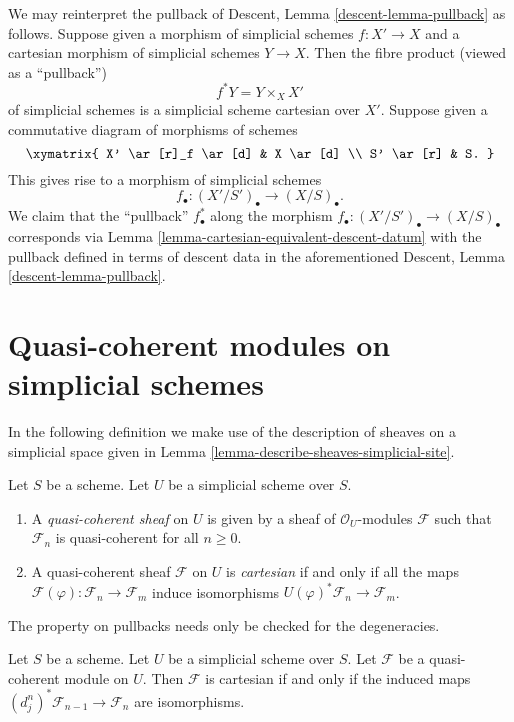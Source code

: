 \noindent
We may reinterpret the pullback of
Descent, Lemma \ref{descent-lemma-pullback} as follows.
Suppose given a morphism of simplicial schemes $f : X' \to X$ and a
cartesian morphism of simplicial schemes $Y \to X$. Then
the fibre product (viewed as a ``pullback'')
$$
f^*Y = Y \times_X X'
$$
of simplicial schemes is a simplicial scheme cartesian over $X'$.
Suppose given a commutative diagram of morphisms of schemes
$$
\xymatrix{
X' \ar[r]_f \ar[d] & X \ar[d] \\
S' \ar[r] & S.
}
$$
This gives rise to a morphism of simplicial schemes
$$
f_\bullet : (X'/S')_\bullet \longrightarrow (X/S)_\bullet.
$$
We claim that the ``pullback'' $f_\bullet^*$ along the morphism
$f_\bullet : (X'/S')_\bullet \to (X/S)_\bullet$ corresponds via
Lemma \ref{lemma-cartesian-equivalent-descent-datum}
with the pullback defined in terms of descent data in
the aforementioned
Descent, Lemma \ref{descent-lemma-pullback}.







\section{Quasi-coherent modules on simplicial schemes}
\label{section-modules-simplicial}

\noindent
In the following definition we make use of the description of
sheaves on a simplicial space given in
Lemma \ref{lemma-describe-sheaves-simplicial-site}.

\begin{definition}
\label{definition-cartesian-sheaf}
Let $S$ be a scheme. Let $U$ be a simplicial scheme over $S$.
\begin{enumerate}
\item A {\it quasi-coherent sheaf} on $U$ is given by
a sheaf of $\mathcal{O}_U$-modules $\mathcal{F}$ such that
$\mathcal{F}_n$ is quasi-coherent for all $n \geq 0$.
\item A quasi-coherent sheaf $\mathcal{F}$ on $U$ is {\it cartesian}
if and only if all the maps
$\mathcal{F}(\varphi) : \mathcal{F}_n \to \mathcal{F}_m$
induce isomorphisms
$U(\varphi)^*\mathcal{F}_n \to \mathcal{F}_m$.
\end{enumerate}
\end{definition}

\noindent
The property on pullbacks needs only be checked for the degeneracies.

\begin{lemma}
\label{lemma-check-cartesian-module}
Let $S$ be a scheme. Let $U$ be a simplicial scheme over $S$.
Let $\mathcal{F}$ be a quasi-coherent module on $U$.
Then $\mathcal{F}$ is cartesian if and only if the induced
maps $(d^n_j)^*\mathcal{F}_{n - 1} \to \mathcal{F}_n$ are
isomorphisms.
\end{lemma}

